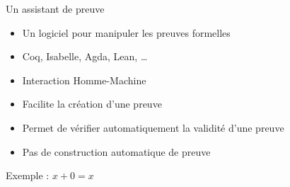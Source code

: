 \documentclass[french,usepdftitle=false,compress]{beamer}
\begin{document}
\begin{frame}{Un assistant de preuve}
  \begin{block}{}
    \begin{itemize}
      \item Un logiciel pour manipuler les preuves formelles
      \item Coq, Isabelle, Agda, Lean, \dots
      \item Interaction Homme-Machine
    \end{itemize}
  \end{block}

  \begin{exampleblock}{}
    \begin{itemize}
      \item Facilite la création d'une preuve
      \item Permet de vérifier automatiquement la validité d'une preuve
    \end{itemize}
  \end{exampleblock}

  \begin{alertblock}{}
    \begin{itemize}
      \item Pas de construction automatique de preuve
    \end{itemize}
  \end{alertblock}
\end{frame}

\begin{frame}{Exemple : $x + 0 = x$}
  \inputminted{coq}{basic.v}
\end{frame}
\end{document}
